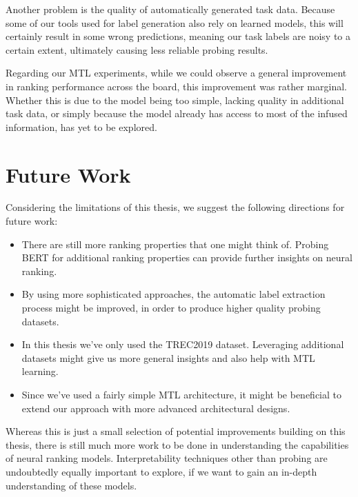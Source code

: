 Another problem is the quality of automatically generated task data. Because some of our tools used for label generation also rely on learned models, this will certainly result in some wrong predictions, meaning our task labels are noisy to a certain extent, ultimately causing less reliable probing results.

Regarding our MTL experiments, while we could observe a general improvement in ranking performance across the board, this improvement was rather marginal. Whether this is due to the model being too simple, lacking quality in additional task data, or simply because the model already has access to most of the infused information, has yet to be explored.

\section{Future Work}
\label{sec:future}
Considering the limitations of this thesis, we suggest the following directions for future work:
\begin{itemize}
    \item There are still more ranking properties that one might think of. Probing BERT for additional ranking properties can provide further insights on neural ranking.
    \item By using more sophisticated approaches, the automatic label extraction process might be improved, in order to produce higher quality probing datasets.
    \item In this thesis we've only used the TREC2019 dataset. Leveraging additional datasets might give us more general insights and also help with MTL learning.
    \item Since we've used a fairly simple MTL architecture, it might be beneficial to extend our approach with more advanced architectural designs.
\end{itemize}
Whereas this is just a small selection of potential improvements building on this thesis, there is still much more work to be done in understanding the capabilities of neural ranking models. Interpretability techniques other than probing are undoubtedly equally important to explore, if we want to gain an in-depth understanding of these models.
